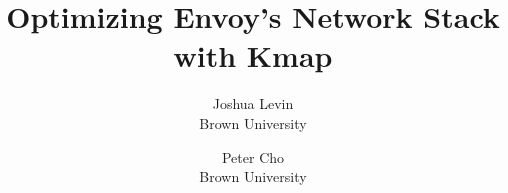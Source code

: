 \usepackage{balance}

\newcommand{\needscitation}[1]{\textbf{\color{blue} NEEDS CITATION}}

\newcommand{\josh}[1]{\textbf{\color{red} Josh's Comment :: #1 }}
\newcommand{\peter}[1]{\textbf{\color{orange} Peter's Comment :: #1 }}

\newcommand{\sysname}{Kmap\xspace}

%
%



\date{}


\title{Optimizing Envoy's Network Stack with \sysname}

 \author{
 {\rm Joshua Levin}\\
 Brown University
 \and
 {\rm Peter Cho}\\
 Brown University
 }

\maketitle
\hypersetup{draft}

%
















